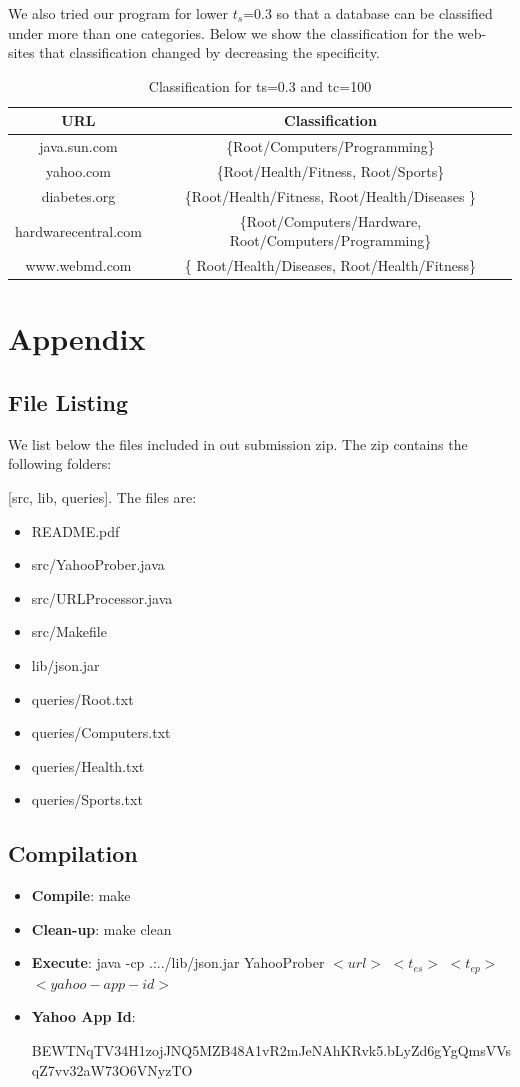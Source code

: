 \documentclass[11pt]{article}
\begin{document}
We also tried our program for lower $t_s$=0.3 so that a database can be classified under more than one categories. Below we show the classification for the web-sites that classification changed
by decreasing the specificity.
\begin{table}
\begin{tabular}{|c|c|}
\hline
\textbf{URL} & \textbf{Classification}\\
\hline
java.sun.com & \{Root/Computers/Programming\} \\
\hline
yahoo.com& \{Root/Health/Fitness, Root/Sports\}\\
\hline
diabetes.org& \{Root/Health/Fitness,
Root/Health/Diseases \}\\
\hline
hardwarecentral.com& \{Root/Computers/Hardware, Root/Computers/Programming\}\\
\hline
www.webmd.com & \{ Root/Health/Diseases, Root/Health/Fitness\} \\
\hline
\end{tabular}
\caption{Classification for ts=0.3 and tc=100}
\label{Res2}
\end{table}

\section* {Appendix}

\subsection* {File Listing}

We list below the files included in out submission zip. The zip contains the following folders:

[src, lib, queries].
The files are:
\begin{itemize}
\item README.pdf
\item src/YahooProber.java
\item src/URLProcessor.java
\item src/Makefile
\item lib/json.jar
\item queries/Root.txt
\item queries/Computers.txt
\item queries/Health.txt
\item queries/Sports.txt
\end{itemize}

\subsection* {Compilation}
\begin{itemize}
\item \textbf{Compile}: make
\item \textbf{Clean-up}: make clean
\item\textbf{Execute}: java -cp .:../lib/json.jar YahooProber $<url>$ $<t_{es}>$ $<t_{ep}>$ $<yahoo-app-id>$
\item \textbf{Yahoo App Id}:

BEWTNqTV34H1zojJNQ5MZB48A1vR2mJeNAhKRvk5.bLyZd6gYgQmsVVsqZ7vv32aW73O6VNyzTO
\end{itemize}
\end{document}

